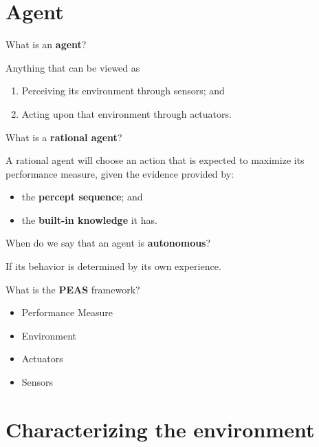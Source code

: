 \section{Agent}

\begin{cstqsn*}
What is an \textbf{agent}?
\end{cstqsn*}

Anything that can be viewed as 

\begin{enumerate}
  \item Perceiving its environment through sensors; and 
  \item Acting upon that environment through actuators.
\end{enumerate}

\begin{cstqsn*}
What is a \textbf{rational agent}?
\end{cstqsn*}

A rational agent will choose an action that is expected to maximize its
performance measure, given the evidence provided by: 

\begin{itemize}
  \item the \textbf{percept sequence}; and 
  \item the \textbf{built-in knowledge} it has.
\end{itemize}

\begin{cstqsn*}
When do we say that an agent is \textbf{autonomous}?
\end{cstqsn*}

If its behavior is determined by its own experience.

\begin{cstqsn*}
What is the \textbf{PEAS} framework?
\end{cstqsn*}

\begin{itemize}
  \item Performance Measure 
  \item Environment 
  \item Actuators 
  \item Sensors
\end{itemize}

\section{Characterizing the environment}

